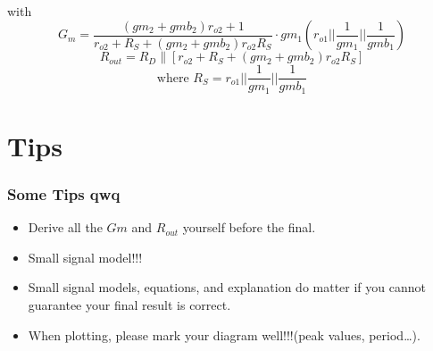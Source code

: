 \documentclass{beamer}
\begin{document}
\begin{frame}
\begin{minipage}{0.3\linewidth}
\begin{figure}[H]
        \end{figure}
    \end{minipage}\\
    with 
    \begin{equation*}
        {G}_{{m}}=\frac{({gm_2}+{gmb_2}) {r}_{{o2}}+1}{{r}_{{o2}}+{R}_{{S}}+({gm_2}+{gmb_2}) {r}_{{o2}} {R}_{{S}}}\cdot gm_1\left( r_{o1}||\dfrac{1}{gm_1}||\frac{1}{gmb_1} \right)
    \end{equation*}
    \begin{equation*}
        R_{{out }}=R_{D} \|\left[r_{o2}+R_{S}+(g m_2+g m b_2) r_{o2} R_{S}\right]
    \end{equation*}
    \begin{equation*}
        \text{where } R_S = r_{o1}||\dfrac{1}{gm_1}||\frac{1}{gmb_1}
    \end{equation*} 

\end{frame}



\section{Tips}
\begin{frame}
    \frametitle{Some Tips qwq}
    \begin{itemize}
        \item Derive all the $Gm$ and $R_{out}$ yourself before the final. 
        \item Small signal model!!!
        \item Small signal models, equations, and explanation do matter if you cannot guarantee your final result is correct. 
        \item When plotting, please mark your diagram well!!!(peak values, period\dots).
    \end{itemize}
\end{frame}
\end{document}
